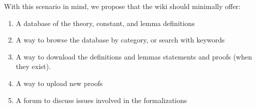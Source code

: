 With this scenario in mind, we propose that the wiki should minimally offer: %

\begin{enumerate}  %
\item A database of the theory, constant, and lemma definitions %
\item A way to browse the database by category, or search with keywords %
\item A way to download the definitions and lemmas statements and proofs (when they exist).  %
\item A way to upload new proofs %
\item A forum to discuss issues involved in the formalizations %
\end{enumerate}  %
